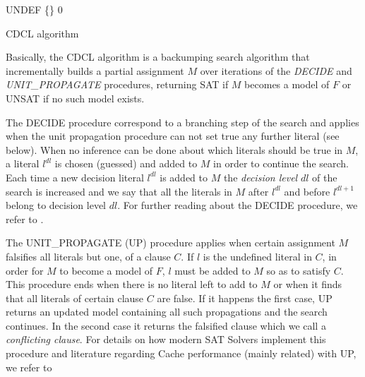 \documentclass{llncs}
\begin{document}
\begin{algorithm}[h]
\SetLine
{}
 \BlankLine
 \Status \assign UNDEF\;
 \Model \assign \{\}\;
 \Dl \assign $0$\;
 \Return \Status
 \caption{CDCL algorithm}
 \label{alg:cdcl}
\end{algorithm}

Basically, the CDCL algorithm is a backumping search algorithm 
that incrementally builds a partial assignment $M$ over iterations of the
\emph{DECIDE} and \emph{UNIT\_PROPAGATE} procedures, returning SAT if $M$ becomes a model of $F$ or 
UNSAT if no such model exists. 

The DECIDE procedure
correspond to a branching step of the search and 
applies when the unit propagation procedure can not set true any further literal (see below).
When no inference can be done about which literals should be true in $M$, a 
literal $l^{dl}$ is chosen (guessed) and added to $M$ in order to 
continue the search.
Each time a new decision literal $l^{dl}$ is added to $M$ the \emph{
decision level} $dl$ of the search is increased and we say that 
all the literals in $M$ after $l^{dl}$ and before $l^{dl+1}$ belong to decision level $dl$.
For further reading about the DECIDE procedure, we refer to \cite{Chaff2001,MiniSat,rsat}.

The UNIT\_PROPAGATE (UP) procedure
applies when certain assignment $M$ falsifies all literals but one, of a clause $C$. 
If $l$ is the undefined literal in $C$, in order for $M$ to become a model of $F$, $l$ 
must be added to $M$ so as to satisfy $C$. This procedure ends
when there is no literal left to add to $M$ or when it finds that all literals
of certain clause $C$ are false. 
If it happens the first case, UP returns 
an updated model containing all such propagations and the search continues. 
In the second case it returns the falsified clause which we call a \emph{conflicting clause}.
For details on how modern SAT Solvers implement this procedure and literature regarding
Cache performance (mainly related) with UP, we refer to \cite{Chaff2001,ZhangMalik2003SAT}
 
\end{document}
